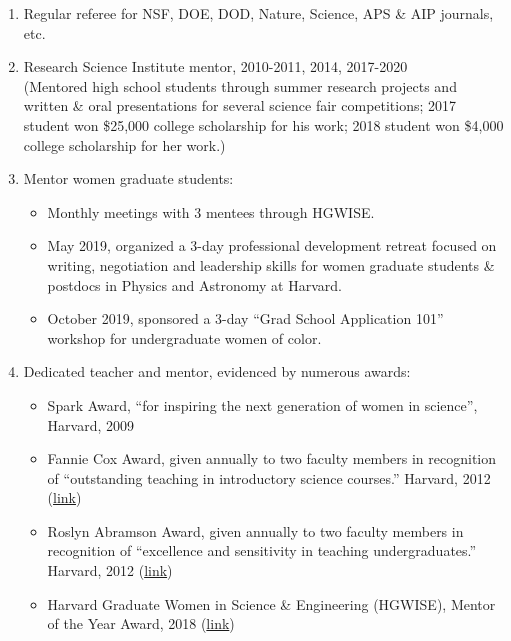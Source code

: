 \documentclass[12pt]{article}
\begin{document}
\begin{enumerate}

\item Regular referee for NSF, DOE, DOD, Nature, Science, APS \& AIP journals, etc.

\item Research Science Institute mentor, 2010-2011, 2014, 2017-2020 \\
    (Mentored high school students through summer research projects and written \& oral presentations for several science fair competitions; 2017 student won \$25,000 college scholarship for his work; 2018 student won \$4,000 college scholarship for her work.)

\item Mentor women graduate students:
\begin{itemize}
    \item Monthly meetings with 3 mentees through HGWISE.
    \item May 2019, organized a 3-day professional development retreat focused on writing, negotiation and leadership skills for women graduate students \& postdocs in Physics and Astronomy at Harvard.
    \item October 2019, sponsored a 3-day ``Grad School Application 101'' workshop for undergraduate women of color.
\end{itemize}

\item Dedicated teacher and mentor, evidenced by numerous awards:
\begin{itemize}
    \item Spark Award, ``for inspiring the next generation of women in science'', Harvard, 2009
    \item Fannie Cox Award, given annually to two faculty members in recognition of
``outstanding teaching in introductory science courses.'' Harvard, 2012 (\href{https://news.harvard.edu/gazette/story/2012/10/two-professors-win-fannie-cox-prize/}{link})
    \item Roslyn Abramson Award, given annually to two faculty members in recognition of
``excellence and sensitivity in teaching undergraduates.'' Harvard, 2012 (\href{https://news.harvard.edu/gazette/story/2012/05/hoffman-beerbohm-win-teaching-prize/}{link})
    \item Harvard Graduate Women in Science \& Engineering (HGWISE), Mentor of the Year Award, 2018 (\href{https://gsas.harvard.edu/news/stories/lean-lean-hgwise-mentor-year-award}{link})
\end{itemize}


\end{enumerate}
\end{document}
